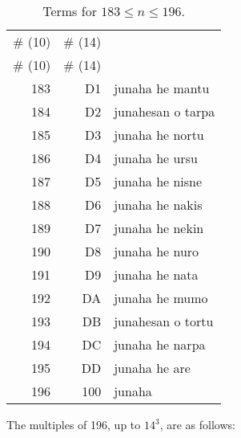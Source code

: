 \documentclass{book}
\begin{document}
\begin{longtabu}[c]{|r|r|X|}
    \caption{Terms for $183 \le n \le 196$.}
    \centering
    
    \\ \hline
    \# (10) & \# (14) & \\
    \hline
    \endfirsthead
    
    \hline
    \# (10) & \# (14) & \\
    \hline
    \endhead
    
    \hline
    \endfoot
    
    \hline
    \endlastfoot
    
    183 & D1 & junaha he mantu \\
    184 & D2 & junahesan o tarpa \\
    185 & D3 & junaha he nortu \\
    186 & D4 & junaha he ursu \\
    187 & D5 & junaha he nisne \\
    188 & D6 & junaha he nakis \\
    189 & D7 & junaha he nekin \\
    190 & D8 & junaha he nuro \\
    191 & D9 & junaha he nata \\
    192 & DA & junaha he mumo \\
    193 & DB & junahesan o tortu \\
    194 & DC & junaha he narpa \\
    195 & DD & junaha he are \\
    196 & 100 & junaha \\
\end{longtabu}

The multiples of 196, up to $14^3$, are as follows:
\end{document}
